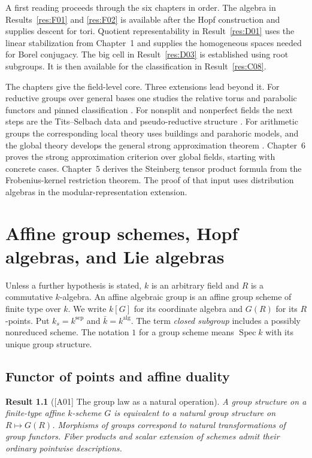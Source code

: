 \documentclass[11pt,a4paper,openany,oneside]{book}
\theoremstyle{resultstyle}
\newtheorem{statement}{Result}[chapter]
\newenvironment{result}[2]{\clubpenalty=10000\begin{statement}[\textnormal{[#1]} #2]\leavevmode\label{res:#1}\ignorespaces}{\end{statement}}
\theoremstyle{definition}
\numberwithin{equation}{chapter}
\begin{document}
A first reading proceeds through the six chapters in order. The algebra in Results~\ref{res:F01} and \ref{res:F02} is available after the Hopf construction and supplies descent for tori. Quotient representability in Result~\ref{res:D01} uses the linear stabilization from Chapter~1 and supplies the homogeneous spaces needed for Borel conjugacy. The big cell in Result~\ref{res:D03} is established using root subgroups. It is then available for the classification in Result~\ref{res:C08}.

The chapters give the field-level core. Three extensions lead beyond it. For reductive groups over general bases one studies the relative torus and parabolic functors and pinned classification \cite{conrad}. For nonsplit and nonperfect fields the next steps are the Tits--Selbach data and pseudo-reductive structure \cite[Sec.~12]{conradfeng}\cite{cgp}. For arithmetic groups the corresponding local theory uses buildings and parahoric models, and the global theory develops the general strong approximation theorem \cite{kalethaprasad,rapinchuk}. Chapter~6 proves the strong approximation criterion over global fields, starting with concrete cases. Chapter~5 derives the Steinberg tensor product formula from the Frobenius-kernel restriction theorem. The proof of that input uses distribution algebras in the modular-representation extension.

\mainmatter
\chapter{Affine group schemes, Hopf algebras, and Lie algebras}
\label{chap:affine-groups}

Unless a further hypothesis is stated, \(k\) is an arbitrary field and \(R\) is
a commutative \(k\)-algebra. An affine algebraic group is an affine group
scheme of finite type over \(k\). We write \(k[G]\) for its coordinate
algebra and \(G(R)\) for its \(R\)-points. Put \(k_s=k^{\mathrm{sep}}\) and
\(\bar k=k^{\mathrm{alg}}\). The term \emph{closed subgroup} includes a
possibly nonreduced scheme. The notation \(1\) for a group scheme means
\(\operatorname{Spec}k\) with its unique group structure.

\section{Functor of points and affine duality}

\begin{result}{A01}{The group law as a natural operation}
A group structure on a finite-type affine \(k\)-scheme \(G\) is equivalent
to a natural group structure on \(R\mapsto G(R)\). Morphisms of groups
correspond to natural transformations of group functors. Fiber products
and scalar extension of schemes admit their ordinary pointwise descriptions.
\end{result}
\end{document}
